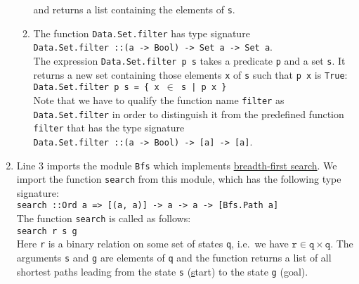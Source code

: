 \begin{enumerate}
\begin{enumerate}
            and returns a list containing the elements of \texttt{s}.
      \item The function \texttt{Data.Set.filter} has type signature
            \\[0.2cm]
            \hspace*{1.3cm}
            \texttt{Data.Set.filter ::\;(a -> Bool) -> Set a -> Set a}.
            \\[0.2cm]
            The expression \texttt{Data.Set.filter p s} takes a predicate \texttt{p} and a set \texttt{s}.
            It returns a new set containing those elements \texttt{x} of \texttt{s} such that \texttt{p x} is
            \texttt{True}:
            \\[0.2cm]
            \hspace*{1.3cm}
            \texttt{Data.Set.filter p s = \{ x $\in$ s | p x \}}
            \\[0.2cm]
            Note that we have to qualify the function name \texttt{filter} as \texttt{Data.Set.filter} in order
            to distinguish it from the predefined function \texttt{filter} that has the type signature
            \\[0.2cm]
            \hspace*{1.3cm}
            \texttt{Data.Set.filter ::\;(a -> Bool) -> [a] -> [a]}.
      \end{enumerate}
      \item Line 3 imports the module \texttt{Bfs} which implements
            \href{https://en.wikipedia.org/wiki/Breadth-first_search}{breadth-first search}.  We import the
            function \texttt{search} from this module, which has the following type signature:
            \\[0.2cm]
            \hspace*{1.3cm}
            \texttt{search ::\;Ord a => [(a, a)] -> a -> a -> [Bfs.Path a]}
            \\[0.2cm]
            The function \texttt{search} is called as follows:
            \\[0.2cm]
            \hspace*{1.3cm}
            \texttt{search r s g}
            \\[0.2cm]
            Here \texttt{r} is a binary relation on some set of states \texttt{q}, i.e.~we have
            $\texttt{r} \in \texttt{q} \times \texttt{q}$. The arguments \texttt{s} and \texttt{g} are elements
            of \texttt{q} and the function returns a list of all shortest paths leading from the state
            \texttt{s} (\underline{s}tart) to the state \texttt{g} (\underline{g}oal).


\end{enumerate}
